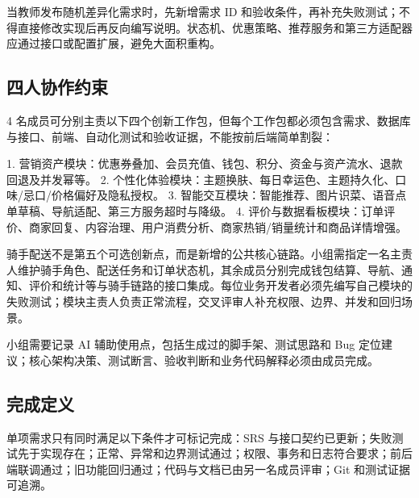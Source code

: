当教师发布随机差异化需求时，先新增需求 ID 和验收条件，再补充失败测试；不得直接修改实现后再反向编写说明。状态机、优惠策略、推荐服务和第三方适配器应通过接口或配置扩展，避免大面积重构。

\subsection{四人协作约束}

4 名成员可分别主责以下四个创新工作包，但每个工作包都必须包含需求、数据库与接口、前端、自动化测试和验收证据，不能按前后端简单割裂：

1. 营销资产模块：优惠券叠加、会员充值、钱包、积分、资金与资产流水、退款回退及并发幂等。
2. 个性化体验模块：主题换肤、每日幸运色、主题持久化、口味/忌口/价格偏好及隐私授权。
3. 智能交互模块：智能推荐、图片识菜、语音点单草稿、导航适配、第三方服务超时与降级。
4. 评价与数据看板模块：订单评价、商家回复、内容治理、用户消费分析、商家热销/销量统计和商品详情增强。

骑手配送不是第五个可选创新点，而是新增的公共核心链路。小组需指定一名主责人维护骑手角色、配送任务和订单状态机，其余成员分别完成钱包结算、导航、通知、评价和统计等与骑手链路的接口集成。每位业务开发者必须先编写自己模块的失败测试；模块主责人负责正常流程，交叉评审人补充权限、边界、并发和回归场景。

小组需要记录 AI 辅助使用点，包括生成过的脚手架、测试思路和 Bug 定位建议；核心架构决策、测试断言、验收判断和业务代码解释必须由成员完成。

\subsection{完成定义}

单项需求只有同时满足以下条件才可标记完成：SRS 与接口契约已更新；失败测试先于实现存在；正常、异常和边界测试通过；权限、事务和日志符合要求；前后端联调通过；旧功能回归通过；代码与文档已由另一名成员评审；Git 和测试证据可追溯。

\endgroup
